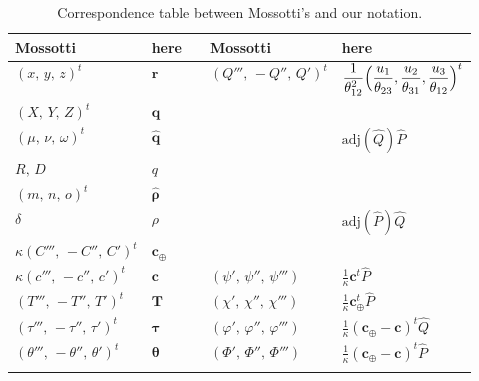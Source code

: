 \documentclass[11pt]{article}
\def\adj{\text{adj}}
\begin{document}
\setlength\extrarowheight{2pt}
\begin{table}[ht!]
\centering
\begin{tabular}{>{\centering\arraybackslash}p{}>{\centering\arraybackslash}p{}>{\centering\arraybackslash}p{}>{\centering\arraybackslash}p{}>{\centering\arraybackslash}p{}}
\cline{1-2}\cline{4-5}
\textbf{Mossotti} & \textbf{here} &  & \textbf{Mossotti} & \textbf{here}\\
\cline{1-2}\cline{4-5}
$(x,\,y,\,z)^t$ & $\bm{r}$ &  
& $(Q''',\,-Q'',\,Q')^t$
& $\displaystyle\frac{1}{\theta_{12}^{2}}\Bigl(\frac{u_1}{\theta_{23}}, \frac{u_2}{\theta_{31}}, \frac{u_3}{\theta_{12}}\Bigr)^t$ \\
$(X,\,Y,\,Z)^t$ & $\bm{q}$ & 
& \multirow{3}{=}{$\left(\begin{matrix}B_1''' & B_2''' & B_3'''\\ -B_1'' & -B_2'' & -B_3''\\ B_1' & B_2' & B_3'\\ \end{matrix}\right)$} &\\ %
$(\mu,\,\nu,\,\omega)^t$ & $\hat{\bm{q}}$ & 
& & $\adj(\hat{Q})\hat{P}$ \\ %
$R,\,D$ & $q$ & 
& &\\ %
$(m,\,n,\,o)^t$ & $\hat{\bm{\rho}}$ & 
&  \multirow{3}{=}{$\hspace{2.5mm}\left(\begin{matrix}b_1''' & b_2''' & b_3'''\\ -b_1'' & -b_2'' & -b_3''\\ b_1' & b_2' & b_3'\\ \end{matrix}\right)$} &\\ %
$\delta$ & $\rho$ &
& & $\adj(\hat{P})\hat{Q}$\\ %
$\kappa(C''',\,-C'',\,C')^t$ & $\bm{c}_\oplus$ & 
& &\\ %
$\kappa(c''',\,-c'',\,c')^t$ & $\bm{c}$ & 
& $(\psi',\,\psi'',\,\psi''')$&$\frac{1}{\kappa}\bm{c}^t\hat{P}$\\ %
$(T''',\,-T'',\,T')^t$ & $\bm{T}$ & 
& $(\chi',\,\chi'',\,\chi''')$&$\frac{1}{\kappa}\bm{c}_\oplus^t\hat{P}$\\ %
$(\tau''',\,-\tau'',\,\tau')^t$ & $\bm{\tau}$ & 
& $(\varphi',\,\varphi'',\,\varphi''')$&$\frac{1}{\kappa}(\bm{c}_\oplus-\bm{c})^t\hat{Q}$\\ %
$(\theta''',\,-\theta'',\,\theta')^t$ & $\bm{\theta}$ &
& $(\Phi',\,\Phi'',\,\Phi''')$&$\frac{1}{\kappa}(\bm{c}_\oplus-\bm{c})^t\hat{P}$\\ \cline{1-2}\cline{4-5}\\
    \end{tabular}
    \caption{Correspondence table between Mossotti's and our notation.}
  \label{compare}
\end{table}


{}

\end{document}
